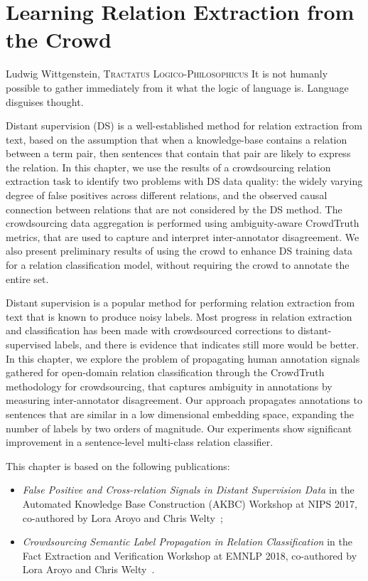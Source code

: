 \chapter{Learning Relation Extraction from the Crowd}
\label{chap:od-rel-ex}

\begin{chapquote}{Ludwig Wittgenstein, \textsc{Tractatus Logico-Philosophicus}}
It is not humanly possible to gather immediately from it what the logic of language is. Language disguises thought.
\end{chapquote}

Distant supervision (DS) is a well-established method for relation extraction from text, based on the assumption that when a knowledge-base contains a relation between a term pair, then sentences that contain that pair are likely to express the relation. In this chapter, we use the results of a crowdsourcing relation extraction task to identify two problems with DS data quality: the widely varying degree of false positives across different relations, and the observed causal connection between relations that are not considered by the DS method. The crowdsourcing data aggregation is performed using ambiguity-aware CrowdTruth metrics, that are used to capture and interpret inter-annotator disagreement. We also present preliminary results of using the crowd to enhance DS training data for a relation classification model, without requiring the crowd to annotate the entire set. 

Distant supervision is a popular method for performing relation extraction from text that is known to produce noisy labels.  Most progress in relation extraction and classification has been made with crowdsourced corrections to distant-supervised labels, and there is evidence that indicates still more would be better. In this chapter, we explore the problem of propagating human annotation signals gathered for open-domain relation classification through the CrowdTruth methodology for crowdsourcing, that captures ambiguity in annotations by measuring inter-annotator disagreement. Our approach propagates annotations to sentences that are similar in a low dimensional embedding space, expanding the number of labels by two orders of magnitude.  Our experiments show significant improvement in a sentence-level multi-class relation classifier.

This chapter is based on the following publications:

\begin{itemize}

\item \textit{False Positive and Cross-relation Signals in Distant Supervision Data} in the Automated Knowledge Base Construction (AKBC) Workshop at NIPS 2017, co-authored by Lora Aroyo and Chris Welty~\cite{dumitrache2017false};

\item \textit{Crowdsourcing Semantic Label Propagation in Relation Classification} in the Fact Extraction and Verification Workshop at EMNLP 2018, co-authored by Lora Aroyo and Chris Welty~\cite{dumitrache2018crowdsourcing}.

\end{itemize}

